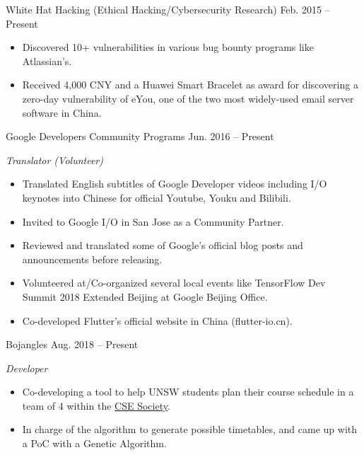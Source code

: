 \documentclass[hidelinks__VERSION__]{adamyi-cv}
\begin{document}
\begin{entrylist}


\entry
{White Hat Hacking (Ethical Hacking/Cybersecurity Research)}
{Feb. 2015 -- Present}
{\begin{itemize}
\item Discovered 10+ vulnerabilities in various bug bounty programs like Atlassian's.
\item Received 4,000 CNY and a Huawei Smart Bracelet as award for discovering a zero-day vulnerability of eYou, one of the two most widely-used email server software in China.
\end{itemize}}


\entry
{Google Developers Community Programs}
{Jun. 2016 -- Present}
{\emph{Translator (Volunteer)}
\begin{itemize}
\item Translated English subtitles of Google Developer videos including I/O keynotes into Chinese for official Youtube, Youku and Bilibili.
\item Invited to Google I/O in San Jose as a Community Partner.
\item Reviewed and translated some of Google's official blog posts and announcements before releasing.
\item Volunteered at/Co-organized several local events like TensorFlow Dev Summit 2018 Extended Beijing at Google Beijing Office.
\item Co-developed Flutter's official website in China (flutter-io.cn).
\end{itemize}}


\entry
{Bojangles}
{Aug. 2018 -- Present}
{\emph{Developer}
\begin{itemize}
\item Co-developing a tool to help UNSW students plan their course schedule in a team of 4 within the \href{https://www.csesoc.unsw.edu.au/}{CSE Society}.
\item In charge of the algorithm to generate possible timetables, and came up with a PoC with a Genetic Algorithm.
\end{itemize}}




\end{entrylist}
\end{document}
